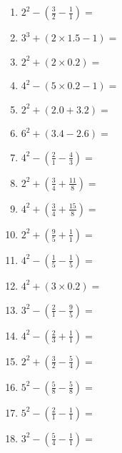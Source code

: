 \documentclass[12pt]{article}
\begin{document}
\begin{enumerate}
\newpage
\item \large $ 2^{2} - (\frac{3}{2} - \frac{1}{1}) = $ \vspace{1.4cm}
\item \large $ 3^{3} + (2 \times 1.5 - 1) = $ \vspace{1.4cm}
\item \large $ 2^{2} + (2 \times 0.2) = $ \vspace{1.4cm}
\item \large $ 4^{2} - (5 \times 0.2 - 1) = $ \vspace{1.4cm}
\item \large $ 2^{2} + (2.0 + 3.2) = $ \vspace{1.4cm}
\item \large $ 6^{2} + (3.4 - 2.6) = $ \vspace{1.4cm}
\item \large $ 4^{2} - (\frac{2}{1} - \frac{4}{3}) = $ \vspace{1.4cm}
\item \large $ 2^{2} + (\frac{3}{4} + \frac{11}{8}) = $ \vspace{1.4cm}
\item \large $ 4^{2} + (\frac{3}{4} + \frac{15}{8}) = $ \vspace{1.4cm}
\item \large $ 2^{2} + (\frac{9}{5} + \frac{1}{1}) = $ \vspace{1.4cm}
\newpage
\item \large $ 4^{2} - (\frac{1}{5} - \frac{1}{5}) = $ \vspace{1.4cm}
\item \large $ 4^{2} + (3 \times 0.2) = $ \vspace{1.4cm}
\item \large $ 3^{2} - (\frac{2}{1} - \frac{9}{5}) = $ \vspace{1.4cm}
\item \large $ 4^{2} - (\frac{2}{3} + \frac{1}{1}) = $ \vspace{1.4cm}
\item \large $ 2^{2} + (\frac{3}{2} - \frac{5}{4}) = $ \vspace{1.4cm}
\item \large $ 5^{2} - (\frac{5}{8} - \frac{5}{8}) = $ \vspace{1.4cm}
\item \large $ 5^{2} - (\frac{2}{1} - \frac{1}{1}) = $ \vspace{1.4cm}
\item \large $ 3^{2} - (\frac{5}{4} - \frac{1}{1}) = $ \vspace{1.4cm}

\end{enumerate}
\end{document}
